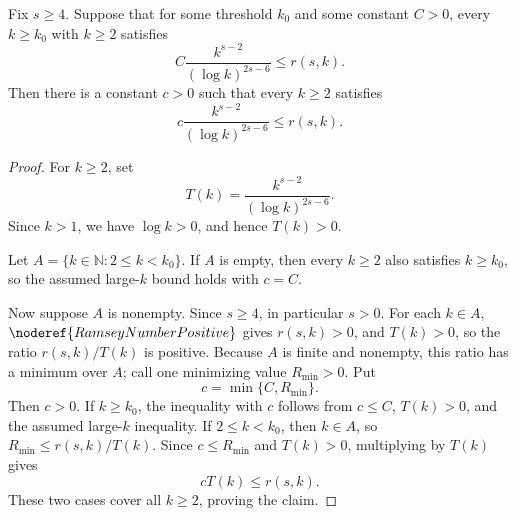 \begin{helper}
Fix \(s\ge4\).  Suppose that for some threshold \(k_0\) and some constant
\(C>0\), every \(k\ge k_0\) with \(k\ge2\) satisfies
\[
  C\frac{k^{s-2}}{(\log k)^{2s-6}}\le r(s,k).
\]
Then there is a constant \(c>0\) such that every \(k\ge2\) satisfies
\[
  c\frac{k^{s-2}}{(\log k)^{2s-6}}\le r(s,k).
\]
\end{helper}
\begin{proof}
For \(k\ge2\), set
\[
  T(k)=\frac{k^{s-2}}{(\log k)^{2s-6}}.
\]
Since \(k>1\), we have \(\log k>0\), and hence \(T(k)>0\).

Let \(A=\{k\in\mathbb N: 2\le k<k_0\}\).  If \(A\) is empty, then every
\(k\ge2\) also satisfies \(k\ge k_0\), so the assumed large-\(k\) bound holds
with \(c=C\).

Now suppose \(A\) is nonempty.  Since \(s\ge4\), in particular \(s>0\).
For each \(k\in A\), \(\noderef{RamseyNumberPositive}\)
gives \(r(s,k)>0\), and \(T(k)>0\), so the ratio \(r(s,k)/T(k)\) is positive.
Because \(A\) is finite and nonempty, this ratio has a minimum over \(A\); call
one minimizing value \(R_{\min}>0\).  Put
\[
  c=\min\{C,R_{\min}\}.
\]
Then \(c>0\).  If \(k\ge k_0\), the inequality with \(c\) follows from
\(c\le C\), \(T(k)>0\), and the assumed large-\(k\) inequality.  If
\(2\le k<k_0\), then \(k\in A\), so \(R_{\min}\le r(s,k)/T(k)\).  Since
\(c\le R_{\min}\) and \(T(k)>0\), multiplying by \(T(k)\) gives
\[
  cT(k)\le r(s,k).
\]
These two cases cover all \(k\ge2\), proving the claim.
\end{proof}

